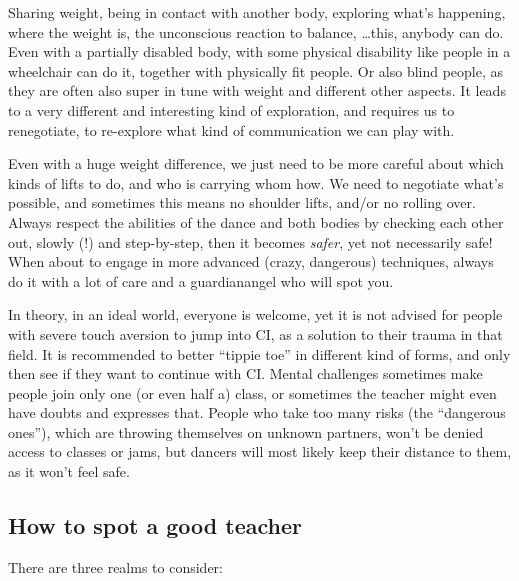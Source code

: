 Sharing weight, being in contact with another body, exploring what's happening, where the weight is, the unconscious reaction to balance, \ldots this, anybody can do.
Even with a partially disabled body, with some physical disability like people in a wheelchair can do it, together with physically fit people.
Or also blind people, as they are often also super in tune with weight and different other aspects.
It leads to a very different and interesting kind of exploration, and requires us to renegotiate, to re-explore what kind of communication we can play with.

Even with a huge weight difference, we just need to be more careful about which kinds of lifts to do, and who is carrying whom how.
We need to negotiate what's possible, and sometimes this means no shoulder lifts, and/or no rolling over.
Always respect the abilities of the dance and both bodies by checking each other out, slowly (!) and step-by-step, then it becomes \textit{safer}, yet not necessarily safe!
When about to engage in more advanced (crazy, dangerous) techniques, always do it with a lot of care and a \gls{guardianangel} who will spot you.

In theory, in an ideal world, everyone is welcome, yet it is not advised for people with severe touch aversion to jump into CI, as a solution to their trauma in that field.
It is recommended to better ``tippie toe'' in different kind of forms, and only then see if they want to continue with CI.
Mental challenges sometimes make people join only one (or even half a) class, or sometimes the teacher might even have doubts and expresses that.
People who take too many risks (the ``dangerous ones''), which are throwing themselves on unknown partners, won't be denied access to classes or jams, but dancers will most likely keep their distance to them, as it won't feel safe.

\subsection{How to spot a good teacher}\label{subsec:how-to-spot-a-good-teacher}

There are three realms to consider:


